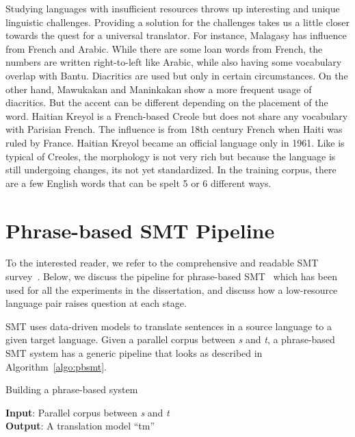 Studying languages with insufficient resources throws up interesting and unique linguistic challenges.  Providing a solution for the challenges takes us a little closer towards the quest for a universal translator. For instance, Malagasy has influence from French and Arabic. While there are some loan words from French, the numbers are written right-to-left like Arabic, while also having some vocabulary overlap with Bantu. Diacritics are used but only in certain circumstances. On the other hand, Mawukakan and Maninkakan show a more frequent usage of diacritics. But the accent can be different depending on the placement of the word. Haitian Kreyol is a French-based Creole but does not share any vocabulary with Parisian French. The influence is from 18th century French when Haiti was ruled by France. Haitian Kreyol became an official language only in 1961. Like is typical of Creoles, the morphology is not very rich but because the language is still undergoing changes, its not yet standardized. In the training corpus, there are a few English words that can be spelt 5 or 6 different ways.

\section{Phrase-based SMT Pipeline}
\label{sec:generic_pipelin}
To the interested reader, we refer to the comprehensive and readable SMT survey~\cite{Lopez07asurvey}. Below, we discuss the pipeline for phrase-based SMT~\cite{Koehn:03} which has been used for all the experiments in the dissertation, and discuss how a low-resource language pair raises question at each stage. 

SMT uses data-driven models to translate sentences in a source language to a given target language. Given a parallel corpus between \emph{s} and \emph{t}, a phrase-based SMT system has a generic pipeline that looks as described in Algorithm~\ref{algo:pbsmt}. 

\begin{algorithm}
\small
\caption{Building a phrase-based system}
\label{algo:pbsmt}
\textbf{Input}: Parallel corpus between \emph{s} and \emph{t} \\
\textbf{Output}: A translation model ``tm'' 
\begin{algorithmic}[l]
	 \label{aline:alignments}
	 \label{aline:scores}
	 \label{aline:MERT}
	 \label{aline:decoding}
\end{algorithmic}
\end{algorithm}

